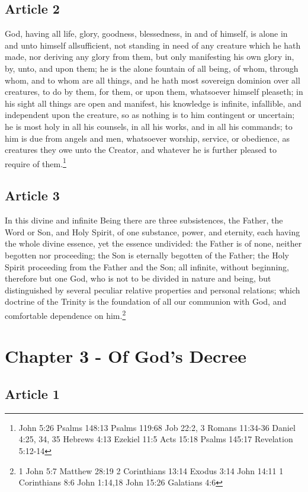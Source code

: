 \documentclass[12pt,letterpaper]{book}
\begin{document}
\section{Article 2}

God, having all life, glory, goodness, blessedness, in and of himself, is alone in and unto himself allsufficient, not standing in need of any creature which he hath made, nor deriving any glory from them, but only manifesting his own glory in, by, unto, and upon them; he is the alone fountain of all being, of whom, through whom, and to whom are all things, and he hath most sovereign dominion over all creatures, to do by them, for them, or upon them, whatsoever himself pleaseth; in his sight all things are open and manifest, his knowledge is infinite, infallible, and independent upon the creature, so as nothing is to him contingent or uncertain; he is most holy in all his counsels, in all his works, and in all his commands; to him is due from angels and men, whatsoever worship, service, or obedience, as creatures they owe unto the Creator, and whatever he is further pleased to require of them.\footnote{John 5:26 Psalms 148:13 Psalms 119:68 Job 22:2, 3 Romans 11:34-36 Daniel 4:25, 34, 35 Hebrews 4:13 Ezekiel 11:5 Acts 15:18 Psalms 145:17 Revelation 5:12-14}

\section{Article 3}

In this divine and infinite Being there are three subsistences, the Father, the Word or Son, and Holy Spirit, of one substance, power, and eternity, each having the whole divine essence, yet the essence undivided: the Father is of none, neither begotten nor proceeding; the Son is eternally begotten of the Father; the Holy Spirit proceeding from the Father and the Son; all infinite, without beginning, therefore but one God, who is not to be divided in nature and being, but distinguished by several peculiar relative properties and personal relations; which doctrine of the Trinity is the foundation of all our communion with God, and comfortable dependence on him.\footnote{1 John 5:7 Matthew 28:19 2 Corinthians 13:14 Exodus 3:14 John 14:11 1 Corinthians 8:6 John 1:14,18 John 15:26 Galatians 4:6}

\chapter{Chapter 3 - Of God's Decree}
\section{Article 1}
\end{document}
